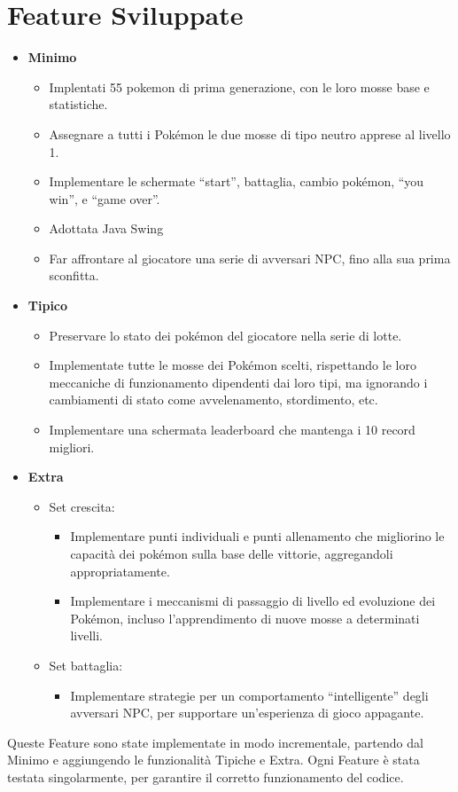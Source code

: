 \documentclass[12pt]{article}
\begin{document}
\section{Feature Sviluppate}
\begin{itemize}
    \item \textbf{Minimo}
          \begin{itemize}
              \item Implentati 55 pokemon di prima generazione, con le loro mosse base e statistiche.
              \item Assegnare a tutti i Pokémon le due mosse di tipo neutro apprese al livello 1.
              \item Implementare le schermate “start”, battaglia, cambio pokémon, “you win”, e “game over”.
              \item Adottata Java Swing
              \item Far affrontare al giocatore una serie di avversari NPC, fino alla sua prima sconfitta.
          \end{itemize}
    \item \textbf{Tipico}
          \begin{itemize}
              \item Preservare lo stato dei pokémon del giocatore nella serie di lotte.
              \item Implementate tutte le mosse dei Pokémon scelti, rispettando le loro meccaniche di funzionamento dipendenti dai loro tipi, ma ignorando i cambiamenti di stato come avvelenamento, stordimento, etc.
              \item Implementare una schermata leaderboard che mantenga i 10 record migliori.
          \end{itemize}
    \item \textbf{Extra}
          \begin{itemize}
              \item Set crescita:
                    \begin{itemize}
                        \item Implementare punti individuali e punti allenamento che migliorino le capacità dei pokémon sulla base delle vittorie, aggregandoli appropriatamente.
                        \item Implementare i meccanismi di passaggio di livello ed evoluzione dei Pokémon, incluso l’apprendimento di nuove mosse a determinati livelli.
                    \end{itemize}
              \item Set battaglia:
                    \begin{itemize}
                        \item Implementare strategie per un comportamento “intelligente” degli avversari NPC, per supportare un’esperienza di gioco appagante.
                    \end{itemize}
          \end{itemize}
\end{itemize}
Queste Feature sono state implementate in modo incrementale, partendo dal Minimo e aggiungendo le funzionalità Tipiche e Extra. Ogni Feature è stata testata singolarmente, per garantire il corretto funzionamento del codice.
\end{document}
